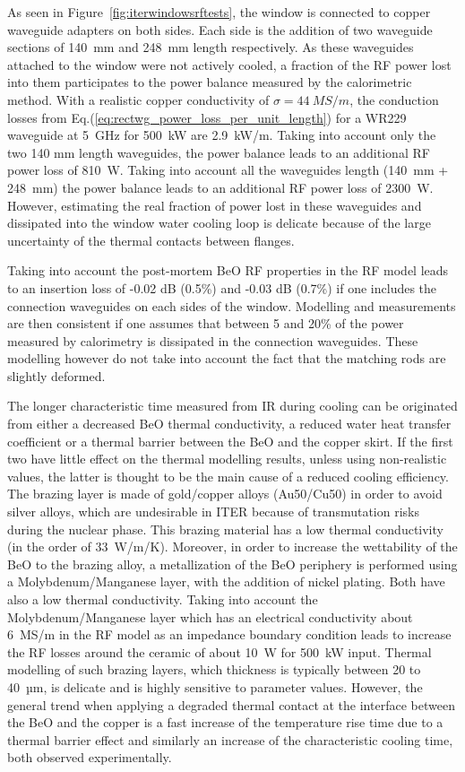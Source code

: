 {As seen in Figure~\ref{fig:iterwindowsrftests}, the window is connected to copper waveguide adapters on both sides. Each side is the addition of two waveguide sections of 140~mm and 248~mm length respectively. As these waveguides attached to the window were not actively cooled, a fraction of the RF power lost into them participates to the power balance measured by the calorimetric method. With a realistic copper conductivity of $\sigma=44~\si{MS/m}$, the conduction losses  from Eq.(\ref{eq:rectwg_power_loss_per_unit_length}) for a WR229 waveguide at 5~GHz for 500~kW are 2.9~kW/m. Taking into account only the two 140 mm length waveguides, the power balance leads to an additional RF power loss of 810~W. Taking into account all the waveguides length (140~mm + 248~mm) the power balance leads to an additional RF power loss of 2300~W. However, estimating the real fraction of power lost in these waveguides and dissipated into the window water cooling loop is delicate because of the large uncertainty of the thermal contacts between flanges. 

Taking into account the post-mortem BeO RF properties in the RF model leads to an insertion loss of -0.02 dB (0.5\%) and -0.03 dB (0.7\%) if one includes the connection waveguides on each sides of the window. Modelling and measurements are then consistent if one assumes that between 5 and 20\% of the power measured by calorimetry is dissipated in the connection waveguides. These modelling however do not take into account the fact that the matching rods are slightly deformed.

The longer characteristic time measured from IR during cooling can be originated from either a decreased BeO thermal conductivity, a reduced water heat transfer coefficient or a thermal barrier between the BeO and the copper skirt. If the first two have little effect on the thermal modelling results, unless using non-realistic values, the latter is thought to be the main cause of a reduced cooling efficiency. The brazing layer is made of gold/copper alloys (Au50/Cu50) in order to avoid silver alloys, which are undesirable in ITER because of transmutation risks during the nuclear phase. This brazing material has a low thermal conductivity (in the order of 33~\si{W/m/K}). Moreover, in order to increase the wettability of the BeO to the brazing alloy, a metallization of the BeO periphery is performed using a Molybdenum/Manganese layer, with the addition of nickel plating. Both have also a low thermal conductivity. Taking into account the Molybdenum/Manganese layer which has an electrical conductivity about 6~MS/m in the RF model as an impedance boundary condition leads to increase the RF losses around the ceramic of about 10~W for 500~kW input. Thermal modelling of such brazing layers, which thickness is typically between 20 to 40~µm, is delicate and is highly sensitive to parameter values. However, the general trend when applying a degraded thermal contact at the interface between the BeO and the copper is a fast increase of the temperature rise time due to a thermal barrier effect and similarly an increase of the characteristic cooling time, both observed experimentally. 


}
